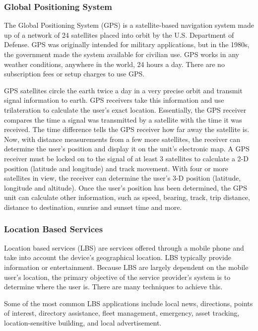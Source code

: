 \subsubsection{Global Positioning System}
The Global Positioning System (GPS) is a satellite-based navigation system made up of a network of 24 satellites placed into orbit by the U.S. Department of Defense\cite{DefiniGPS}. GPS was originally intended for military applications, but in the 1980s, the government made the system available for civilian use. GPS works in any weather conditions, anywhere in the world, 24 hours a day. There are no subscription fees or setup charges to use GPS.\par
GPS satellites circle the earth twice a day in a very precise orbit and transmit signal information to earth. GPS receivers take this information and use trilateration to calculate the user's exact location. Essentially, the GPS receiver compares the time a signal was transmitted by a satellite with the time it was received. The time difference tells the GPS receiver how far away the satellite is. Now, with distance measurements from a few more satellites, the receiver can determine the user's position and display it on the unit's electronic map. A GPS receiver must be locked on to the signal of at least 3 satellites to calculate a 2-D position (latitude and longitude) and track movement. With four or more satellites in view, the receiver can determine the user's 3-D position (latitude, longitude and altitude). Once the user's position has been determined, the GPS unit can calculate other information, such as speed, bearing, track, trip distance, distance to destination, sunrise and sunset time and more.\par 


\subsubsection{Location Based Services}
Location based services (LBS) are services offered through a mobile phone and take into account the device’s geographical location\cite{DefiniLBS}. LBS typically provide information or entertainment. Because LBS are largely dependent on the mobile user’s location, the primary objective of the service provider’s system is to determine where the user is. There are many techniques to achieve this.\par 

Some of the most common LBS applications include local news, directions, points of interest, directory assistance, fleet management, emergency, asset tracking, location-sensitive building, and local advertisement.\par

